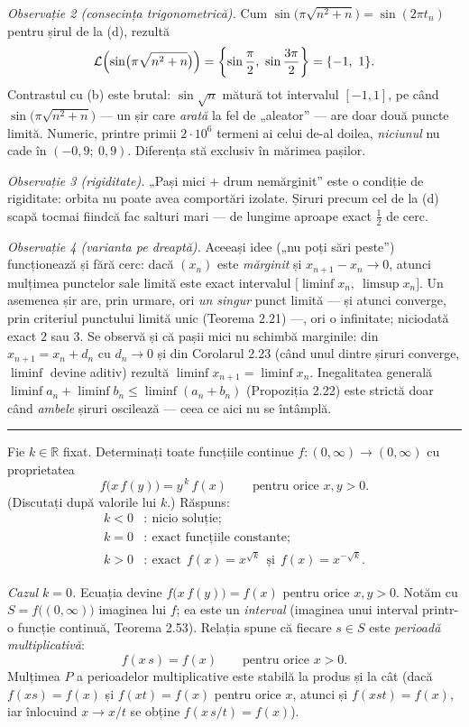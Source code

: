\emph{Observație 2 (consecința trigonometrică).} Cum $\sin\bigl(\pi\sqrt{n^{2}+n}\bigr)=\sin(2\pi t_n)$ pentru șirul de la (d), rezultă
\[ \mathcal{L}\Bigl(\sin\bigl(\pi\sqrt{n^{2}+n}\bigr)\Bigr)=\left\{\sin\frac\pi2,\ \sin\frac{3\pi}{2}\right\}=\{-1,\ 1\} . \]
Contrastul cu (b) este brutal: $\sin\sqrt n$ mătură tot intervalul $[-1,1]$, pe când $\sin\bigl(\pi\sqrt{n^{2}+n}\bigr)$ --- un șir care \emph{arată} la fel de „aleator'' --- are doar două puncte limită. Numeric, printre primii $2\cdot10^{6}$ termeni ai celui de-al doilea, \emph{niciunul} nu cade în $(-0{,}9;\ 0{,}9)$. Diferența stă exclusiv în mărimea pașilor.

\emph{Observație 3 (rigiditate).} „Pași mici + drum nemărginit'' este o condiție de rigiditate: orbita nu poate avea comportări izolate. Șiruri precum cel de la (d) scapă tocmai fiindcă fac salturi mari --- de lungime aproape exact $\frac12$ de cerc.

\emph{Observație 4 (varianta pe dreaptă).} Aceeași idee („nu poți sări peste'') funcționează și fără cerc: dacă $(x_n)$ este \emph{mărginit} și $x_{n+1}-x_n\to0$, atunci mulțimea punctelor sale limită este exact intervalul $\bigl[\liminf x_n,\ \limsup x_n\bigr]$. Un asemenea șir are, prin urmare, ori \emph{un singur} punct limită --- și atunci converge, prin criteriul punctului limită unic (Teorema 2.21) ---, ori o infinitate; niciodată exact $2$ sau $3$. Se observă și că pașii mici nu schimbă marginile: din $x_{n+1}=x_n+d_n$ cu $d_n\to0$ și din Corolarul 2.23 (când unul dintre șiruri converge, $\liminf$ devine aditiv) rezultă $\liminf x_{n+1}=\liminf x_n$. Inegalitatea generală $\liminf a_n+\liminf b_n\le\liminf(a_n+b_n)$ (Propoziția 2.22) este strictă doar când \emph{ambele} șiruri oscilează --- ceea ce aici nu se întâmplă.
\vspace{1mm}\hrule

Fie $k\in\mathbb{R}$ fixat. Determinați toate funcțiile continue $f:(0,\infty)\to(0,\infty)$ cu proprietatea
\[ f\bigl(x\,f(y)\bigr)=y^{\,k}\,f(x)\qquad\text{pentru orice }x,y>0 . \]
(Discutați după valorile lui $k$.)
\sol Răspuns:
\[ \begin{aligned} k<0&:\ \text{nicio soluție};\\ k=0&:\ \text{exact funcțiile constante};\\ k>0&:\ \text{exact}\ \ f(x)=x^{\sqrt k}\ \ \text{și}\ \ f(x)=x^{-\sqrt k} . \end{aligned} \]

\emph{Cazul $k=0$.} Ecuația devine $f\bigl(x\,f(y)\bigr)=f(x)$ pentru orice $x,y>0$. Notăm cu $S=f\bigl((0,\infty)\bigr)$ imaginea lui $f$; ea este un \emph{interval} (imaginea unui interval printr-o funcție continuă, Teorema 2.53). Relația spune că fiecare $s\in S$ este \emph{perioadă multiplicativă}:
\[ f(x\,s)=f(x)\qquad\text{pentru orice }x>0 . \]
Mulțimea $P$ a perioadelor multiplicative este stabilă la produs și la cât (dacă $f(xs)=f(x)$ și $f(xt)=f(x)$ pentru orice $x$, atunci și $f(xst)=f(x)$, iar înlocuind $x\to x/t$ se obține $f(x\,s/t)=f(x)$).

